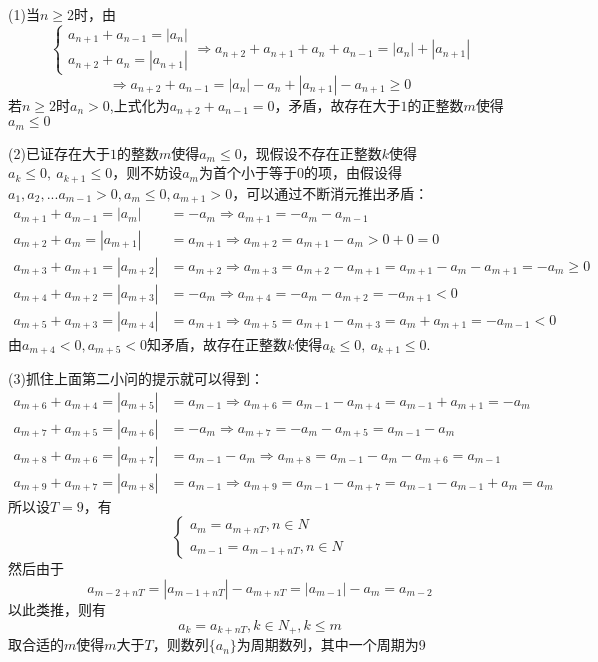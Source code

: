 \begin{solution}
    (1)当$n\ge 2$时，由\[
    \begin{cases}a_{n+1}+a_{n-1}=|a_n|\\a_{n+2}+a_{n}=|a_{n+1}|\end{cases}\Rightarrow a_{n+2}+a_{n+1}+a_n+a_{n-1}=|a_n|+|a_{n+1}|
    \]\[
    \Rightarrow a_{n+2}+a_{n-1}=|a_n|-a_n+|a_{n+1}|-a_{n+1}\ge 0
    \]
    若$n\ge 2$时$a_n>0$,上式化为$a_{n+2}+a_{n-1}=0$，矛盾，故存在大于$1$的正整数$m$使得$a_m\le 0$
 
    \noindent(2)已证存在大于$1$的整数$m$使得$a_m\le 0$，现假设不存在正整数$k$使得$a_k\le 0,~a_{k+1}\le 0$，则不妨设$a_m$为首个小于等于$0$的项，由假设得$a_1,a_2,...a_{m-1}>0,a_m\le 0, a_{m+1}>0$，可以通过不断消元推出矛盾：\vspace{-10pt}
    \begin{align*}
    a_{m+1}+a_{m-1}=|a_m|&=-a_m\Rightarrow a_{m+1}=-a_m-a_{m-1}\\
    a_{m+2}+a_m=|a_{m+1}|&=a_{m+1}\Rightarrow a_{m+2}=a_{m+1}-a_m>0+0=0\\
    a_{m+3}+a_{m+1}=|a_{m+2}|&=a_{m+2}\Rightarrow a_{m+3}=a_{m+2}-a_{m+1}=a_{m+1}-a_m-a_{m+1}=-a_m\geq 0\\
    a_{m+4}+a_{m+2}=|a_{m+3}|&=-a_{m}\Rightarrow a_{m+4}=-a_{m}-a_{m+2}=-a_{m+1}<0\\
    a_{m+5}+a_{m+3}=|a_{m+4}|&=a_{m+1}\Rightarrow a_{m+5}=a_{m+1}-a_{m+3}=a_m+a_{m+1}=-a_{m-1}<0
    \end{align*}
    由$a_{m+4}<0,a_{m+5}<0$知矛盾，故存在正整数$k$使得$a_k\le 0,~a_{k+1}\le 0$.

\noindent(3)抓住上面第二小问的提示就可以得到：
    \vspace{-5pt}\begin{align*}
    a_{m+6}+a_{m+4}=|a_{m+5}|&=a_{m-1}\Rightarrow a_{m+6}=a_{m-1}-a_{m+4}=a_{m-1}+a_{m+1}=-a_m\\
    a_{m+7}+a_{m+5}=|a_{m+6}|&=-a_{m}\Rightarrow a_{m+7}=-a_{m}-a_{m+5}=a_{m-1}-a_m\\
    a_{m+8}+a_{m+6}=|a_{m+7}|&=a_{m-1}-a_m\Rightarrow a_{m+8}=a_{m-1}-a_m-a_{m+6}=a_{m-1}\\
    a_{m+9}+a_{m+7}=|a_{m+8}|&=a_{m-1}\Rightarrow a_{m+9}=a_{m-1}-a_{m+7}=a_{m-1}-a_{m-1}+a_{m}=a_m
    \end{align*}\vspace{-15pt}
    所以设$T=9$，有\[\begin{cases}a_{m}=a_{m+nT},n\in N\\a_{m-1}=a_{m-1+nT},n\in N\end{cases}\]
    然后由于\[a_{m-2+nT}=|a_{m-1+nT}|-a_{m+nT}=|a_{m-1}|-a_{m}=a_{m-2}\]以此类推，则有\[
    a_k=a_{k+nT},k\in N_+,k\leq m\]取合适的$m$使得$m$大于$T$，则数列$\{a_n\}$为周期数列，其中一个周期为9
\end{solution}
